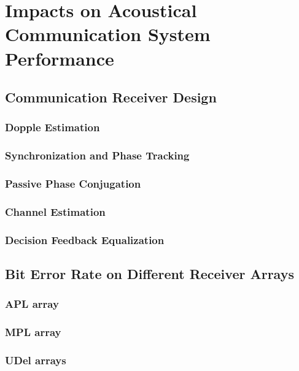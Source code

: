 
\chapter{Impacts on Acoustical Communication System Performance}
\section{Communication Receiver Design}
\subsection{Dopple Estimation}
\subsection{Synchronization and Phase Tracking}
\subsection{Passive Phase Conjugation}
\subsection{Channel Estimation}
\subsection{Decision Feedback Equalization}

\section{Bit Error Rate on Different Receiver Arrays}
\subsection{APL array}
\subsection{MPL array}
\subsection{UDel arrays}
